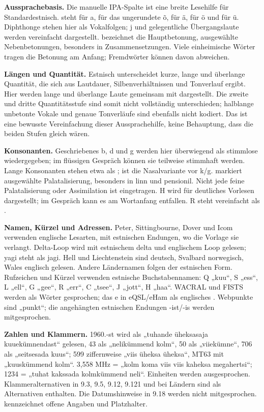 \documentclass[a4paper,landscape,10pt]{article}
\newcommand{\ipa}[1]{{\ipafont[#1]}}
\begin{document}
\smallskip
\textbf{Aussprachebasis.} Die manuelle IPA-Spalte ist eine breite Lesehilfe für Standardestnisch.
\ipa{ɑ} steht für a, \ipa{ɤ} für das ungerundete õ, \ipa{æ} für ä, \ipa{ø} für ö und \ipa{y} für ü.
Diphthonge stehen hier als Vokalfolgen; j und gelegentliche Übergangslaute werden vereinfacht dargestellt.
\ipa{ˈ} bezeichnet die Hauptbetonung, \ipa{ˌ} ausgewählte Nebenbetonungen, besonders in Zusammensetzungen.
Viele einheimische Wörter tragen die Betonung am Anfang; Fremdwörter können davon abweichen.

\smallskip
\textbf{Längen und Quantität.} Estnisch unterscheidet kurze, lange und überlange Quantität,
die sich aus Lautdauer, Silbenverhältnissen und Tonverlauf ergibt.
Hier werden lange und überlange Laute gemeinsam mit \ipa{ː} dargestellt.
Die zweite und dritte Quantitätsstufe sind somit nicht vollständig unterschieden;
halblange unbetonte Vokale und genaue Tonverläufe sind ebenfalls nicht kodiert.
Das ist eine bewusste Vereinfachung dieser Aussprachehilfe, keine Behauptung, dass die beiden Stufen gleich wären.

\smallskip
\textbf{Konsonanten.} Geschriebenes b, d und g werden hier überwiegend als stimmlose \ipa{p, t, k}
wiedergegeben; im flüssigen Gespräch können sie teilweise stimmhaft werden.
Lange Konsonanten stehen etwa als \ipa{nː, lː, tː}; \ipa{ŋ} ist die Nasalvariante vor k/g.
\ipa{ʲ} markiert ausgewählte Palatalisierung, besonders in linn und pensionil.
Nicht jede feine Palatalisierung oder Assimilation ist eingetragen.
H wird für deutliches Vorlesen dargestellt; im Gespräch kann es am Wortanfang entfallen.
R steht vereinfacht als \ipa{r}.

\smallskip
\textbf{Namen, Kürzel und Adressen.} Peter, Sittingbourne, Dover und Icom verwenden englische Lesarten,
mit estnischen Endungen, wo die Vorlage sie verlangt.
Delta-Loop wird mit estnischem delta und englischem Loop gelesen; yagi steht als jagi.
Hell und Liechtenstein sind deutsch, Svalbard norwegisch, Wales englisch gelesen.
Andere Ländernamen folgen der estnischen Form. Rufzeichen und Kürzel verwenden estnische Buchstabennamen:
Q „kuu“, S „ess“, L „ell“, G „gee“, R „err“, C „tsee“, J „jott“, H „haa“.
WACRAL und FISTS werden als Wörter gesprochen; das e in eQSL/eHam als englisches \ipa{iː}.
Webpunkte sind „punkt“; die angehängten estnischen Endungen -ist/-is werden mitgesprochen.

\smallskip
\textbf{Zahlen und Klammern.} 1960.-st wird als „tuhande üheksasaja kuuekümnendast“ gelesen,
43 als „nelikümmend kolm“, 50 als „viiekümne“, 706 als „seitsesada kuus“;
599 ziffernweise „viis üheksa üheksa“, MT63 mit „kuuskümmend kolm“.
3,558 MHz = „kolm koma viis viis kaheksa megahertsi“;
1234 = „tuhat kakssada kolmkümmend neli“. Einheiten werden ausgesprochen.
Klammeralternativen in 9.3, 9.5, 9.12, 9.121 und bei Ländern sind als Alternativen enthalten.
Die Datumshinweise in 9.18 werden nicht mitgesprochen. \ipa{…} kennzeichnet offene Angaben und Platzhalter.
\end{document}

